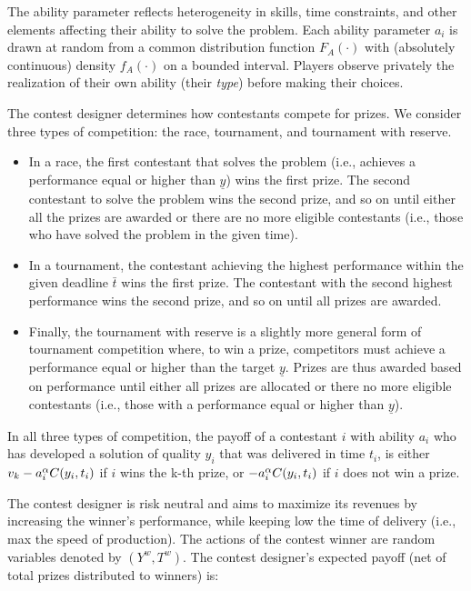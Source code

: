 \documentclass[10pt, titlepage]{article}
\newcommand\deadline{\bar{t}}
\newcommand\target{\underline{y}}
\begin{document}
The ability parameter reflects heterogeneity in skills, time
constraints, and other elements affecting their ability to solve the
problem. Each ability parameter \(a_i\) is drawn at random from a common
distribution function \(F_A(\cdot)\) with (absolutely continuous)
density \(f_A(\cdot)\) on a bounded interval. Players observe privately
the realization of their own ability (their \emph{type}) before making
their choices.

The contest designer determines how contestants compete for prizes. We
consider three types of competition: the race, tournament, and
tournament with reserve.

\begin{itemize}
\item
  In a race, the first contestant that solves the problem (i.e.,
  achieves a performance equal or higher than \(\target\)) wins the
  first prize. The second contestant to solve the problem wins the
  second prize, and so on until either all the prizes are awarded or
  there are no more eligible contestants (i.e., those who have solved
  the problem in the given time).
\item
  In a tournament, the contestant achieving the highest performance
  within the given deadline \(\deadline\) wins the first prize. The
  contestant with the second highest performance wins the second prize,
  and so on until all prizes are awarded.
\item
  Finally, the tournament with reserve is a slightly more general form
  of tournament competition where, to win a prize, competitors must
  achieve a performance equal or higher than the target \(\target\).
  Prizes are thus awarded based on performance until either all prizes
  are allocated or there no more eligible contestants (i.e., those with
  a performance equal or higher than \(\target\)).
\end{itemize}

In all three types of competition, the payoff of a contestant \(i\) with
ability \(a_i\) who has developed a solution of quality \(y_i\) that was
delivered in time \(t_i\), is either
\(v_k - a_i^\alpha C(y_i, t_i)\) if \(i\) wins the k-th prize, or
\(-a_i^\alpha C(y_i, t_i)\) if \(i\) does not win a prize.

The contest designer is risk neutral and aims to maximize its revenues
by increasing the winner's performance, while keeping low the time of
delivery (i.e., max the speed of production). The actions of the contest
winner are random variables denoted by \((Y^w, T^w)\). The contest
designer's expected payoff (net of total prizes distributed to winners)
is:
\end{document}
